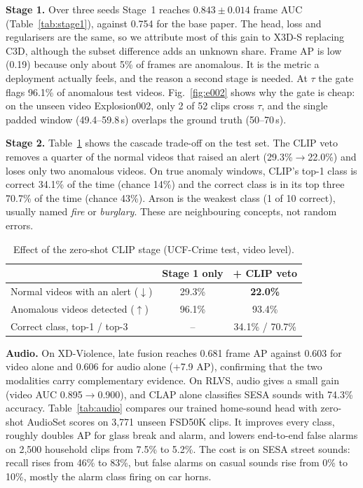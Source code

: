 \documentclass[conference,a4paper]{IEEEtran}
\begin{document}
\textbf{Stage 1.} Over three seeds Stage~1 reaches $0.843\pm0.014$ frame AUC (Table~\ref{tab:stage1}),
against 0.754 for the base paper. The head, loss and regularisers are the same, so we attribute most of this gain to
X3D-S replacing C3D, although the subset difference adds an unknown share. Frame AP is low (0.19) because only about
5\% of frames are anomalous. It is the metric a deployment actually feels, and the reason a second stage is needed.
At $\tau$ the gate flags 96.1\% of anomalous test videos. Fig.~\ref{fig:e002} shows why the gate is cheap: on the
unseen video Explosion002, only 2 of 52 clips cross $\tau$, and the single padded window (49.4--59.8\,s) overlaps
the ground truth (50--70\,s).


\textbf{Stage 2.} Table~\ref{tab:stage2} shows the cascade trade-off on the test set. The CLIP veto removes a
quarter of the normal videos that raised an alert (29.3\%$\to$22.0\%) and loses only two anomalous videos. On true
anomaly windows, CLIP's top-1 class is correct 34.1\% of the time (chance 14\%) and the correct class is in its top
three 70.7\% of the time (chance 43\%). Arson is the weakest class (1 of 10 correct), usually named \emph{fire} or
\emph{burglary}. These are neighbouring concepts, not random errors.

\begin{table}[t]
\centering
\caption{Effect of the zero-shot CLIP stage (UCF-Crime test, video level).}
\label{tab:stage2}
\footnotesize
\begin{tabular}{@{}lcc@{}}
\toprule
 & Stage 1 only & + CLIP veto \\
\midrule
Normal videos with an alert ($\downarrow$) & 29.3\% & \textbf{22.0\%} \\
Anomalous videos detected ($\uparrow$) & 96.1\% & 93.4\% \\
Correct class, top-1 / top-3 & -- & 34.1\% / 70.7\% \\
\bottomrule
\end{tabular}
\end{table}

\textbf{Audio.} On XD-Violence, late fusion reaches 0.681 frame AP against 0.603 for video alone and 0.606 for audio
alone (+7.9 AP), confirming that the two modalities carry complementary evidence. On RLVS, audio gives a small gain
(video AUC 0.895$\to$0.900), and CLAP alone classifies SESA sounds with 74.3\% accuracy.
Table~\ref{tab:audio} compares our trained home-sound head with zero-shot AudioSet scores on 3{,}771 unseen FSD50K
clips. It improves every class, roughly doubles AP for glass break and alarm, and lowers end-to-end false alarms on
2{,}500 household clips from 7.5\% to 5.2\%. The cost is on SESA street sounds: recall rises from 46\% to 83\%, but
false alarms on casual sounds rise from 0\% to 10\%, mostly the alarm class firing on car horns.
\end{document}
